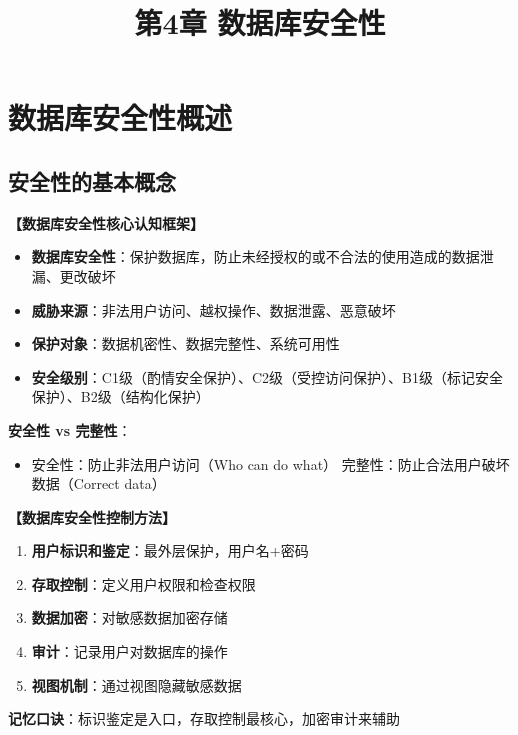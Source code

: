 \documentclass[12pt, a4paper]{article}
\title{\textbf{第4章 数据库安全性}}
\date{}
\newenvironment{bluebox}[1]{%
  \begin{trivlist}
  \item[\hskip\labelsep \textbf{#1}]
  \setlength{\parskip}{0.5ex}
  \setlength{\itemsep}{0.5ex}
}{%
  \end{trivlist}
}
\begin{document}
\maketitle
\thispagestyle{empty}
\newpage

\section{数据库安全性概述}

\subsection{安全性的基本概念}

\begin{bluebox}{核心概念框架}
	\textbf{【数据库安全性核心认知框架】}

	\begin{itemize}[leftmargin=*, nosep]
		\item \textbf{数据库安全性}：保护数据库，防止未经授权的或不合法的使用造成的数据泄漏、更改破坏
		\item \textbf{威胁来源}：非法用户访问、越权操作、数据泄露、恶意破坏
		\item \textbf{保护对象}：数据机密性、数据完整性、系统可用性
		\item \textbf{安全级别}：C1级（酌情安全保护）、C2级（受控访问保护）、B1级（标记安全保护）、B2级（结构化保护）
	\end{itemize}

	\textbf{安全性 vs 完整性}：
	\begin{itemize}
		\item 安全性：防止非法用户访问（Who can do what）
		      完整性：防止合法用户破坏数据（Correct data）
	\end{itemize}
\end{bluebox}

\begin{bluebox}{安全性控制方法}
	\textbf{【数据库安全性控制方法】}

	\begin{enumerate}[leftmargin=*, label=\textbf{\arabic*.}]
		\item \textbf{用户标识和鉴定}：最外层保护，用户名+密码
		\item \textbf{存取控制}：定义用户权限和检查权限
		\item \textbf{数据加密}：对敏感数据加密存储
		\item \textbf{审计}：记录用户对数据库的操作
		\item \textbf{视图机制}：通过视图隐藏敏感数据
	\end{enumerate}

	\textbf{记忆口诀}：标识鉴定是入口，存取控制最核心，加密审计来辅助
\end{bluebox}
\end{document}
